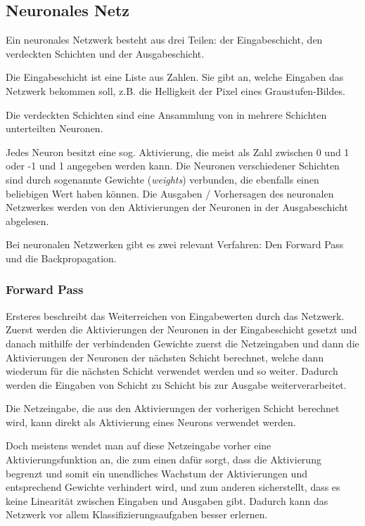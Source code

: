 \documentclass[10pt]{article}
\newcommand{\eng}[1]{\textit{#1}}
\begin{document}
\subsection{Neuronales Netz}

Ein neuronales Netzwerk besteht aus drei Teilen: der Eingabeschicht, den verdeckten Schichten und der Ausgabeschicht. 

Die Eingabeschicht ist eine Liste aus Zahlen. 
Sie gibt an, welche Eingaben das Netzwerk bekommen soll, z.B. die Helligkeit der Pixel eines Graustufen-Bildes.

Die verdeckten Schichten sind eine Ansammlung von in mehrere Schichten unterteilten Neuronen.

Jedes Neuron besitzt eine sog. Aktivierung, die meist als Zahl zwischen 0 und 1 oder -1 und 1 angegeben werden kann. 
Die Neuronen verschiedener Schichten sind durch sogenannte Gewichte (\eng{weights}) verbunden, die ebenfalls einen beliebigen Wert haben können.
Die Ausgaben / Vorhersagen des neuronalen Netzwerkes werden von den Aktivierungen der Neuronen in der Ausgabeschicht abgelesen.

Bei neuronalen Netzwerken gibt es zwei relevant Verfahren: Den Forward Pass und die Backpropagation.

\subsubsection{Forward Pass}

Ersteres beschreibt das Weiterreichen %
von Eingabewerten durch das Netzwerk.
Zuerst werden die Aktivierungen der Neuronen in der Eingabeschicht gesetzt und danach mithilfe der verbindenden Gewichte zuerst die Netzeingaben und dann die Aktivierungen der Neuronen der nächsten Schicht berechnet, welche dann wiederum für die nächsten Schicht verwendet werden und so weiter.
Dadurch werden die Eingaben von Schicht zu Schicht bis zur Ausgabe weiterverarbeitet.

Die Netzeingabe, die aus den Aktivierungen der vorherigen Schicht berechnet wird, kann direkt als Aktivierung eines Neurons verwendet werden.

Doch meistens wendet man auf diese Netzeingabe vorher eine Aktivierungsfunktion an, die zum einen dafür sorgt, dass die Aktivierung begrenzt und somit ein unendliches Wachstum der Aktivierungen und entsprechend Gewichte verhindert wird, und zum anderen sicherstellt, dass es keine Linearität zwischen Eingaben und Ausgaben gibt. 
Dadurch kann das Netzwerk vor allem Klassifizierungsaufgaben besser erlernen. %
\end{document}
